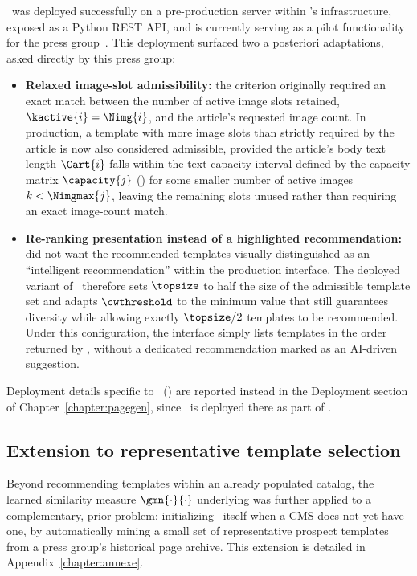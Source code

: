 \trs\ was deployed successfully on a pre-production server within \melody's infrastructure, exposed as a Python REST API, and is currently serving as a pilot functionality for the \publihebdos press group~\cite{publihebdos}. This deployment surfaced two a posteriori adaptations, asked directly by this press group:

\begin{itemize}
    \item \textbf{Relaxed image-slot admissibility:} the criterion originally required an exact match between the number of active image slots retained, $\kactive{i} = \Nimg{i}$, and the article's requested image count. In production, a template with more image slots than strictly required by the article is now also considered admissible, provided the article's body text length $\Cart{i}$ falls within the text capacity interval defined by the capacity matrix $\capacity{j}$ () for some smaller number of active images $k < \Nimgmax{j}$, leaving the remaining slots unused rather than requiring an exact image-count match.
    \item \textbf{Re-ranking presentation instead of a highlighted recommendation:} \publihebdos did not want the recommended templates visually distinguished as an ``intelligent recommendation'' within the production interface. The deployed variant of \trs\ therefore sets $\topsize$ to half the size of the admissible template set and adapts $\cwthreshold$ to the minimum value that still guarantees diversity while allowing exactly $\topsize/2$ templates to be recommended. Under this configuration, the interface simply lists templates in the order returned by \trs, without a dedicated recommendation marked as an AI-driven suggestion.
\end{itemize}

Deployment details specific to \neuralmethod\ () are reported instead in the Deployment section of Chapter~\ref{chapter:pagegen}, since \neuralmethod\ is deployed there as part of \methodNameGeneral.


\subsection*{Extension to representative template selection}

Beyond recommending templates within an already populated catalog, the learned similarity measure $\gmn{\cdot}{\cdot}$ underlying \trs was further applied to a complementary, prior problem: initializing \templatecatalog\ itself when a CMS does not yet have one, by automatically mining a small set of representative prospect templates from a press group's historical page archive. This extension is detailed in Appendix~\ref{chapter:annexe}.

